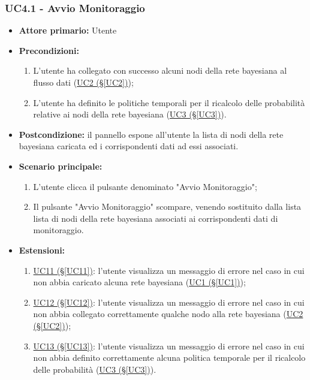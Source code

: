 \subsubsection{UC4.1 - Avvio Monitoraggio}\label{UC4.1}
\begin{itemize}
\item \textbf{Attore primario:} Utente
\item \textbf{Precondizioni:}
	\begin{enumerate}
	\item L'utente ha collegato con successo alcuni nodi della rete bayesiana al flusso dati (\hyperref[UC2]{UC2 					(§\ref*{UC2})});
	\item L'utente ha definito le politiche temporali per il ricalcolo delle probabilità relative ai nodi della rete bayesiana (\hyperref[UC3]{UC3 (§\ref*{UC3})}).
	\end{enumerate}
\item \textbf{Postcondizione:} il pannello espone all'utente la lista di nodi della rete bayesiana caricata ed i corrispondenti dati ad essi associati.
\item \textbf{Scenario principale:}
	\begin{enumerate}
	\item L'utente clicca il pulsante denominato "Avvio Monitoraggio";
	\item Il pulsante "Avvio Monitoraggio" scompare, venendo sostituito dalla lista lista di nodi della rete 	bayesiana associati ai corrispondenti dati di monitoraggio.
	\end{enumerate}
\item \textbf{Estensioni:}
	\begin{enumerate}
	\item \hyperref[UC11]{UC11 (§\ref*{UC11})}: l'utente visualizza un messaggio di errore nel caso in cui non abbia caricato alcuna rete bayesiana (\hyperref[UC1]{UC1 (§\ref*{UC1})});
	\item \hyperref[UC12]{UC12 (§\ref*{UC12})}: l'utente visualizza un messaggio di errore nel caso in cui non abbia collegato correttamente qualche nodo alla rete bayesiana (\hyperref[UC2]{UC2 (§\ref*{UC2})});
	\item \hyperref[UC13]{UC13 (§\ref*{UC13})}: l'utente visualizza un messaggio di errore nel caso in cui non abbia definito correttamente alcuna politica temporale per il ricalcolo delle probabilità (\hyperref[UC3]{UC3 (§\ref*{UC3})}).
	\end{enumerate}
\end{itemize}

